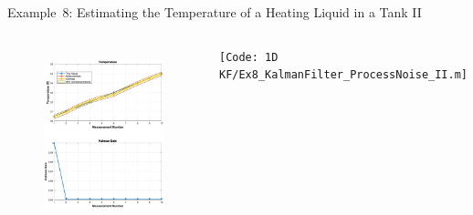 \begin{frame}{Example~8: Estimating the Temperature of a Heating Liquid in a Tank II}
\begin{columns}
    \begin{figure}
        \centering
        \includegraphics[width=1\textwidth]{Figures/Chapter1/ex8_KalmanFilter_ProcessNoise_II.eps}
    \label{fig:ex8_KalmanFilter_ProcessNoise_II}
    \vspace{-15pt}
    \end{figure}
        \texttt{\tiny [Code: 1D KF/Ex8\_KalmanFilter\_ProcessNoise\_II.m]}
\end{columns}
    
\end{frame}
